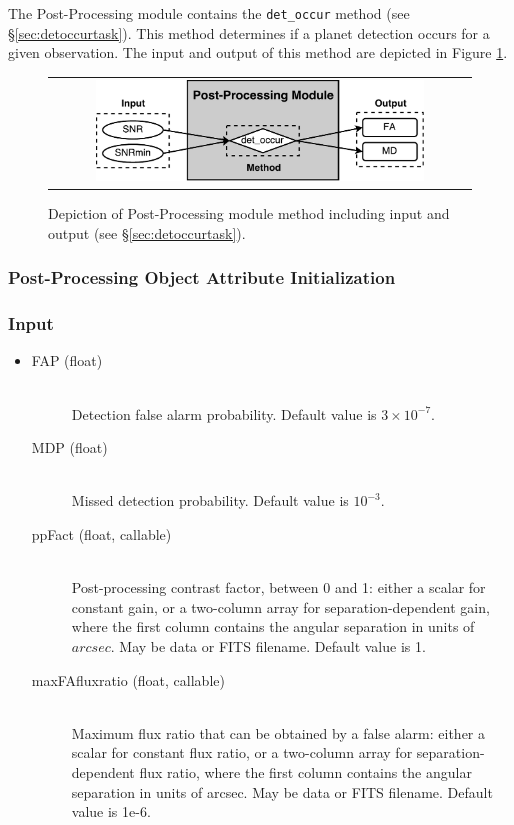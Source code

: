 \documentclass[cleanfoot]{asme2ej}
\newcommand{\reffig}[1]{Figure \ref{#1}}
\begin{document}
The Post-Processing module contains the \verb+det_occur+ method (see \S\ref{sec:detoccurtask}).  This method determines if a planet detection occurs for a given observation.  The input and output of this method are depicted in \reffig{fig:postprocessingmodule}.

\begin{figure}[ht]
    \begin{center}
        \begin{tabular}{c}
            \includegraphics[width=0.8\textwidth]{PostProcessing2}
        \end{tabular}
    \end{center}
    \caption{\label{fig:postprocessingmodule} Depiction of Post-Processing module method including input and output (see \S\ref{sec:detoccurtask}).}
\end{figure}

\subsubsection{Post-Processing Object Attribute Initialization}

\subsubsection*{Input}
\begin{itemize}
\item 
\begin{description}
    \item[FAP (float)] \hfill \\ Detection false alarm probability. Default value is $3 \times 10^{-7}$.
    \item[MDP (float)] \hfill \\ Missed detection probability. Default value is $10^{-3}$.
    \item[ppFact (float, callable)] \hfill \\ Post-processing contrast factor, between 0 and 1: either a scalar for constant gain, or a two-column array for separation-dependent gain, where the first column contains the angular separation in units of $arcsec$. May be data or FITS filename. Default value is 1.
    \item[maxFAfluxratio (float, callable)] \hfill \\ Maximum flux ratio that can be obtained by a false alarm: either a scalar for constant flux ratio, or a two-column array for separation-dependent flux ratio, where the first column contains the angular separation in units of arcsec. May be data or FITS filename. Default value is 1e-6.
\end{description}
\end{itemize}
\end{document}
